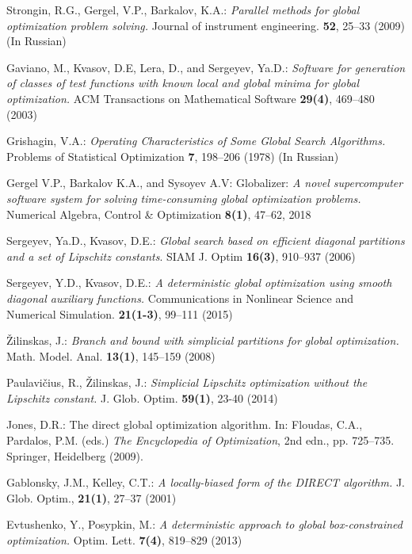 \documentclass[runningheads]{llncs}
\begin{document}
\begin{thebibliography}{107}
Strongin, R.G., Gergel, V.P., Barkalov, K.A.: \emph{Parallel methods for global optimization problem
solving.} Journal of instrument engineering. \textbf{52}, 25--33 (2009) (In Russian)

Gaviano, M., Kvasov, D.E, Lera, D., and Sergeyev, Ya.D.: \emph{Software for generation of classes
of test functions with known local and global minima for global optimization.} ACM
Transactions on Mathematical Software \textbf{29(4)}, 469--480 (2003)

Grishagin, V.A.: \emph{Operating Characteristics of Some Global Search Algorithms.} Problems of
Statistical Optimization \textbf{7}, 198--206 (1978) (In Russian)

Gergel V.P., Barkalov K.A., and Sysoyev A.V: Globalizer: \emph{A novel supercomputer software
system for solving time-consuming global optimization problems.} Numerical Algebra, Control
\& Optimization \textbf{8(1)}, 47--62, 2018

Sergeyev, Ya.D., Kvasov, D.E.: \emph{Global search based on efficient diagonal partitions and a set
of Lipschitz constants}. SIAM J. Optim \textbf{16(3)}, 910--937 (2006)

Sergeyev, Y.D., Kvasov, D.E.: \emph{A deterministic global optimization using smooth diagonal
auxiliary functions.} Communications in Nonlinear Science and Numerical Simulation. \textbf{21(1-3)},
99--111 (2015)

\v Zilinskas, J.: \emph{Branch and bound with simplicial partitions for global optimization.} Math.
Model. Anal. \textbf{13(1)}, 145--159 (2008)

Paulavi\v cius, R., \v Zilinskas, J.: \emph{Simplicial Lipschitz optimization without the Lipschitz
constant.} J. Glob. Optim. \textbf{59(1)}, 23-40 (2014)

Jones, D.R.: The direct global optimization algorithm. In: Floudas, C.A., Pardalos, P.M.
(eds.) \emph{The Encyclopedia of Optimization}, 2nd edn., pp. 725--735. Springer, Heidelberg
(2009).

Gablonsky, J.M., Kelley, C.T.: \emph{A locally-biased form of the DIRECT algorithm.} J. Glob.
Optim., \textbf{21(1)}, 27--37 (2001)

Evtushenko, Y., Posypkin, M.: \emph{A deterministic approach to global box-constrained
optimization.} Optim. Lett. \textbf{7(4)}, 819--829 (2013)

\end{thebibliography}
\end{document}
